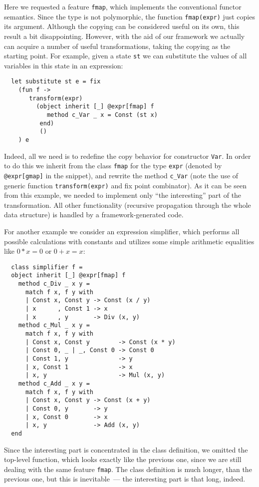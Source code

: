 \documentclass[submission,copyright,creativecommons]{eptcs}
\newcommand{\cd}[1]{\texttt{#1}}
\begin{document}
Here we requested a feature \cd{fmap}, which implements the conventional functor semantics. Since the type is not polymorphic, the function \cd{fmap(expr)}
just copies its argument. Although the copying can be considered useful on its own, this result a bit disappointing. However, with the aid of our framework we
actually can acquire a number of useful transformations, taking the copying as the starting point. For example, given a state \cd{st} we can substitute the
values of all variables in this state in an expression:

\begin{lstlisting}
  let substitute st e = fix
    (fun f ->
       transform(expr)
         (object inherit [_] @expr[fmap] f
            method c_Var _ x = Const (st x)
          end)
          ()
    ) e
\end{lstlisting}

Indeed, all we need is to redefine the copy behavior for constructor \cd{Var}. In order to do this we inherit from the class \cd{fmap} for the type
\cd{expr} (denoted by \cd{@expr[gmap]} in the snippet), and rewrite the method \cd{c\_Var} (note the use of generic function \cd{transform(expr)} and
fix point combinator). As it can be seen from this example, we needed to implement only ``the interesting'' part of the transformation. All other
functionality (recursive propagation through the whole data structure) is handled by a framework-generated code.

For another example we consider an expression simplifier, which performs all possible calculations with constants and utilizes some
simple arithmetic equalities like $0*x=0$ or $0+x=x$:

\begin{lstlisting}
  class simplifier f =
  object inherit [_] @expr[fmap] f
    method c_Div _ x y =
      match f x, f y with
      | Const x, Const y -> Const (x / y)
      | x      , Const 1 -> x
      | x      , y       -> Div (x, y)
    method c_Mul _ x y =
      match f x, f y with
      | Const x, Const y        -> Const (x * y)
      | Const 0, _ | _, Const 0 -> Const 0
      | Const 1, y              -> y
      | x, Const 1              -> x
      | x, y                    -> Mul (x, y)
    method c_Add _ x y =
      match f x, f y with
      | Const x, Const y -> Const (x + y)
      | Const 0, y       -> y
      | x, Const 0       -> x
      | x, y             -> Add (x, y)
  end
\end{lstlisting}

Since the interesting part is concentrated in the class definition, we omitted the top-level function, which looks exactly like the previous one,
since we are still dealing with the same feature \cd{fmap}. The class definition is much longer, than the previous one, but this is
inevitable~--- the interesting part is that long, indeed.
\end{document}
